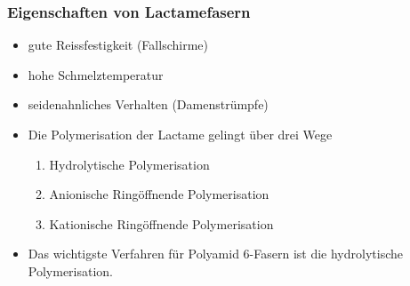 \documentclass[10pt]{beamer}
\begin{document}
\begin{frame}[t]\frametitle{Eigenschaften von Lactamefasern}

\begin{itemize}
  \item gute Reissfestigkeit (Fallschirme)
  \item hohe Schmelztemperatur
  \item \glqq{}seidenahnliches\grqq{} Verhalten (Damenstrümpfe)
\end{itemize}
\end{frame}
\begin{frame}
\begin{itemize}
  \item \scriptsize Die Polymerisation der Lactame gelingt über drei Wege
  \begin{enumerate}
    \item \scriptsize Hydrolytische Polymerisation
    \item \scriptsize Anionische Ringöffnende Polymerisation
    \item \scriptsize Kationische Ringöffnende Polymerisation
  \end{enumerate}

  \item \scriptsize Das wichtigste Verfahren für Polyamid 6-Fasern ist die hydrolytische Polymerisation.
\end{itemize}
\end{frame}
\end{document}
